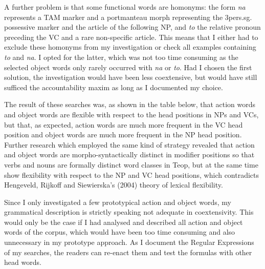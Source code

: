 A further problem is that some functional words are homonyms: the form \textit{na }represents a TAM marker and a portmanteau morph representing the 3pers.sg. possessive marker and the article of the following NP, and \textit{to} the relative pronoun preceding the VC and a rare non-specific article. This means that I either had to exclude these homonyms from my investigation or check all examples containing \textit{to} and \textit{na}. I opted for the latter, which was not too time consuming as the selected object words only rarely occurred with \textit{na} or \textit{to}. Had I chosen the first solution, the investigation would have been less coextensive, but would have still sufficed the accountability maxim as long as I documented my choice.  


The result of these searches was, as shown in the table below, that action words and object words are flexible with respect to the head positions in NPs and VCs, but that, as expected, action words are much more frequent in the VC head position and object words are much more frequent in the NP head position. Further research which employed the same kind of strategy revealed that action and object words are morpho-syntactically distinct in modifier positions so that verbs and nouns are formally distinct word classes in Teop, but at the same time show flexibility with respect to the NP and VC head positions, which contradicts Hengeveld, Rijkoff and Siewierska's (2004) theory of lexical flexibility.


Since I only investigated a few prototypical action and object words, my grammatical description is strictly speaking not adequate in coextensivity. This would only be the case if I had analysed and described all action and object words of the corpus, which would have been too time consuming and also unnecessary in my prototype approach. As I document the Regular Expressions of my searches, the readers can re-enact them and test the formulas with other head words.  

